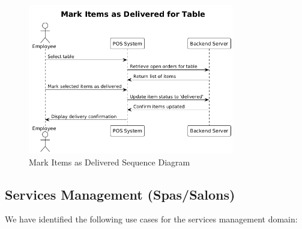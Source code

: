 \documentclass[]{VUMIFTemplateClass}
\begin{document}
\begin{figure}[H]
    \centering
    \includegraphics[width=0.8\textwidth]{images/diagrams/services/order_mark_items_delivered_sequence.png}
    \caption{Mark Items as Delivered Sequence Diagram}
    \label{fig:mark_items_delivered_sequence}
\end{figure}


\subsection{Services Management (Spas/Salons)}

%


We have identified the following use cases for the services management domain:
\end{document}
